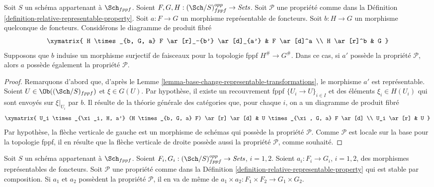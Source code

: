 \begin{lemma}
\label{lemma-descent-representable-transformations-property}
Soit $S$ un schéma appartenant à $\Sch_{fppf}$.
Soient $F, G, H : (\Sch/S)_{fppf}^{opp} \to \textit{Sets}$.
Soit $\mathcal{P}$ une propriété comme dans la
Définition \ref{definition-relative-representable-property}.
Soit $a : F \to G$ un morphisme représentable de foncteurs.
Soit $b : H \to G$ un morphisme quelconque de foncteurs.
Considérons le diagramme de produit fibré
$$
\xymatrix{
H \times_{b, G, a} F \ar[r]_-{b'} \ar[d]_{a'} & F \ar[d]^a \\
H \ar[r]^b & G
}
$$
Supposons que $b$ induise un morphisme surjectif de faisceaux pour la topologie fppf $H^\# \to G^\#$.
Dans ce cas, si $a'$ possède la propriété $\mathcal{P}$, alors $a$
possède également la propriété $\mathcal{P}$.
\end{lemma}

\begin{proof}
Remarquons d'abord que, d'après le
Lemme \ref{lemma-base-change-representable-transformations},
le morphisme $a'$ est représentable.
Soient $U \in \Ob((\Sch/S)_{fppf})$ et
$\xi \in G(U)$. Par hypothèse, il existe un recouvrement fppf
$\{U_i \to U\}_{i \in I}$ et des éléments $\xi_i \in H(U_i)$
qui sont envoyés sur $\xi|_{U_i}$ par $b$. Il résulte de la théorie générale des catégories que, pour
chaque $i$, on a un diagramme de produit fibré
$$
\xymatrix{
U_i \times_{\xi_i, H, a'} (H \times_{b, G, a} F) \ar[r] \ar[d] &
U \times_{\xi, G, a} F \ar[d] \\
U_i \ar[r] & U
}
$$
Par hypothèse, la flèche verticale de gauche est un morphisme de schémas qui
possède la propriété $\mathcal{P}$. Comme $\mathcal{P}$ est locale sur la base pour la
topologie fppf, il en résulte que la flèche verticale de droite possède aussi la propriété
$\mathcal{P}$, comme souhaité.
\end{proof}

\begin{lemma}
\label{lemma-product-representable-transformations-property}
Soit $S$ un schéma appartenant à $\Sch_{fppf}$.
Soient $F_i, G_i : (\Sch/S)_{fppf}^{opp} \to \textit{Sets}$,
$i = 1, 2$.
Soient $a_i : F_i \to G_i$, $i = 1, 2$, des morphismes représentables
de foncteurs.
Soit $\mathcal{P}$ une propriété comme dans la
Définition \ref{definition-relative-representable-property}
qui est stable par composition.
Si $a_1$ et $a_2$ possèdent la propriété $\mathcal{P}$, il en va de même de
$a_1 \times a_2 : F_1 \times F_2 \longrightarrow G_1 \times G_2$.
\end{lemma}

